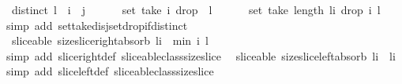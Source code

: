 \begin{isabellebody}
\ \ {\isachardoublequoteopen}distinct\ l\ {\isasymLongrightarrow}\ i\ {\isasymle}\ j\ {\isasymLongrightarrow}\ \isanewline
\ \ \ \ set\ {\isacharparenleft}take\ i\ {\isacharparenleft}drop\ {}\ l{\isacharparenright}{\isacharparenright}\ \isanewline
\ \ \ \ {\isasyminter}\ set\ {\isacharparenleft}take\ {\isacharparenleft}length\ l{\isacharminus}i{\isacharparenright}\ {\isacharparenleft}drop\ i\ l{\isacharparenright}{\isacharparenright}\ {\isacharequal}\ {\isacharbraceleft}{\isacharbraceright}{\isachardoublequoteclose}\isanewline
%
\isadelimproof
%
\endisadelimproof
%
\isatagproof
{}\isamarkupfalse%
\ {\isacharparenleft}simp\ add{\isacharcolon}\ set{\isacharunderscore}take{\isacharunderscore}disj{\isacharunderscore}set{\isacharunderscore}drop{\isacharunderscore}if{\isacharunderscore}distinct\ {\isacharparenright}%
\endisatagproof
{\isafoldproof}%
%
\isadelimproof
\isanewline
%
\endisadelimproof
\isanewline
{}\isamarkupfalse%
\ {\isacharparenleft}\ sliceable{\isacharparenright}\ size{\isacharunderscore}slice{\isacharunderscore}right{\isacharunderscore}absorb{\isacharcolon}\ {\isachardoublequoteopen}{\isacharparenleft}{\isacharhash}{\isacharparenleft}l{\isasymdagger}{\isachardot}{\isachardot}i{\isacharparenright}{\isacharparenright}\ {\isacharequal}\ min\ i\ {\isacharparenleft}{\isacharhash}l{\isacharparenright}{\isachardoublequoteclose}\isanewline
%
\isadelimproof
%
\endisadelimproof
%
\isatagproof
{}\isamarkupfalse%
\ {\isacharparenleft}simp\ add{\isacharcolon}\ slice{\isacharunderscore}right{\isacharunderscore}def\ sliceable{\isacharunderscore}class{\isachardot}size{\isacharunderscore}slice{\isacharparenright}%
\endisatagproof
{\isafoldproof}%
%
\isadelimproof
\isanewline
%
\endisadelimproof
\isanewline
{}\isamarkupfalse%
\ {\isacharparenleft}\ sliceable{\isacharparenright}\ size{\isacharunderscore}slice{\isacharunderscore}left{\isacharunderscore}absorb{\isacharcolon}\ {\isachardoublequoteopen}{\isacharparenleft}{\isacharhash}{\isacharparenleft}l{\isasymdagger}i{\isachardot}{\isachardot}{\isacharparenright}{\isacharparenright}\ {\isacharequal}\ {\isacharparenleft}{\isacharhash}l{\isacharparenright}{\isacharminus}i{\isachardoublequoteclose}\isanewline
%
\isadelimproof
%
\endisadelimproof
%
\isatagproof
{}\isamarkupfalse%
\ {\isacharparenleft}simp\ add{\isacharcolon}\ slice{\isacharunderscore}left{\isacharunderscore}def\ sliceable{\isacharunderscore}class{\isachardot}size{\isacharunderscore}slice{\isacharparenright}%
\endisatagproof
{\isafoldproof}%

\end{isabellebody}
